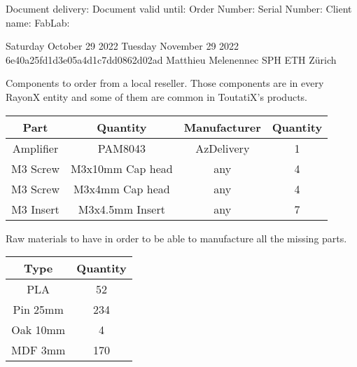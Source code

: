 \documentclass{article}%
\begin{document}
\begin{minipage}{\textwidth}%
\centering%
\begin{minipage}{4cm}%
\flushleft%
Document delivery:%
\linebreak%
Document valid until:%
\linebreak%
Order Number:%
\linebreak%
Serial Number:%
\linebreak%
Client name:%
\linebreak%
FabLab:%
\end{minipage}%
\begin{minipage}{6cm}%
\flushleft%
Saturday October 29 2022%
\linebreak%
Tuesday November 29 2022%
%
\linebreak%
6e40a25fd1d3e05a4d1c7dd0862d02ad%
\linebreak%
Matthieu Melenennec%
\linebreak%
SPH ETH Zürich%
\end{minipage}%
\end{minipage}%
\vspace*{12mm}%
\linebreak%
\subtitle{Sourced Components}%
\vspace*{4mm}%
\linebreak%
Components to order from a local reseller. Those components are in every RayonX entity and some of them are common in ToutatiX's products.%
\begin{longtable}{c|c|c|c}%
\textbf{Part}&\textbf{Quantity}&\textbf{Manufacturer}&\textbf{Quantity}\\%
\hline%
Amplifier&PAM8043&AzDelivery&1\\%
M3 Screw&M3x10mm Cap head&any&4\\%
M3 Screw&M3x4mm Cap head&any&4\\%
M3 Insert&M3x4.5mm Insert&any&7\\%
\end{longtable}%
\subtitle{Raw Materials}%
\vspace*{4mm}%
\linebreak%
Raw materials to have in order to be able to manufacture all the missing parts.%
\begin{longtable}{c|c}%
\textbf{Type}&\textbf{Quantity}\\%
\hline%
PLA&52\\%
Pin 25mm&234\\%
Oak 10mm&4\\%
MDF 3mm&170\\%
\end{longtable}%
\end{document}
